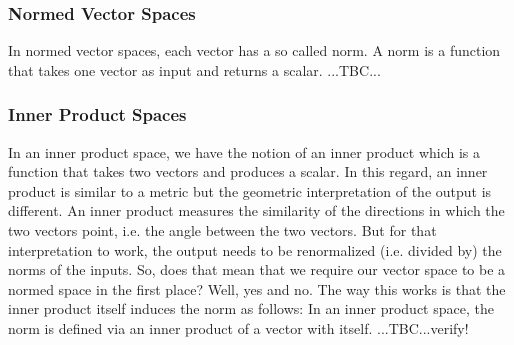 

\subsubsection{Normed Vector Spaces}
In normed vector spaces, each vector has a so called norm. A norm is a function that takes one vector as input and returns a scalar. ...TBC...




 



\subsubsection{Inner Product Spaces}
In an inner product space, we have the notion of an inner product which is a function that takes two vectors and produces a scalar. In this regard, an inner product is similar to a metric but the geometric interpretation of the output is different. An inner product measures the similarity of the directions in which the two vectors point, i.e. the angle between the two vectors. But for that interpretation to work, the output needs to be renormalized (i.e. divided by) the norms of the inputs. So, does that mean that we require our vector space to be a normed space in the first place? Well, yes and no. The way this works is that the inner product itself induces the norm as follows: In an inner product space, the norm is defined via an inner product of a vector with itself. ...TBC...verify!

